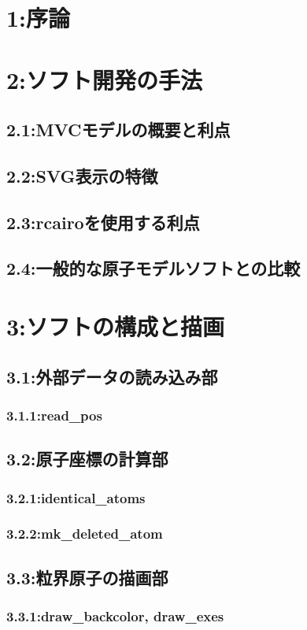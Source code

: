 \section{1:序論}
\section{2:ソフト開発の手法}
\subsection{2.1:MVCモデルの概要と利点}
\subsection{2.2:SVG表示の特徴}
\subsection{2.3:rcairoを使用する利点}
\subsection{2.4:一般的な原子モデルソフトとの比較}
\section{3:ソフトの構成と描画}
\subsection{3.1:外部データの読み込み部}
\subsubsection{3.1.1:read\_pos}
\subsection{3.2:原子座標の計算部}
\subsubsection{3.2.1:identical\_atoms}
\subsubsection{3.2.2:mk\_deleted\_atom}
\subsection{3.3:粒界原子の描画部}
\subsubsection{3.3.1:draw\_backcolor, draw\_exes}
